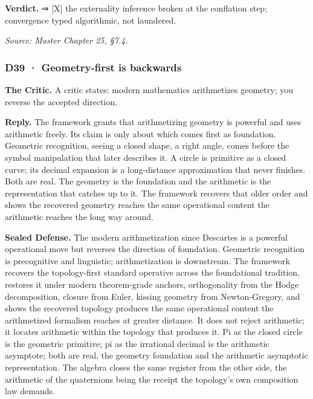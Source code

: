 \documentclass[10pt,twocolumn]{article}
\begin{document}
\textbf{Verdict.} ⇒ {[}X{]} the externality inference broken at the
conflation step; convergence typed algorithmic, not laundered.

\emph{Source: Master Chapter 25, §7.4.}

\hypertarget{d39-geometry-first-is-backwards}{%
\subsubsection{D39 · Geometry-first is
backwards}\label{d39-geometry-first-is-backwards}}

\textbf{The Critic.} A critic states: modern mathematics arithmetizes
geometry; you reverse the accepted direction.

\textbf{Reply.} The framework grants that arithmetizing geometry is
powerful and uses arithmetic freely. Its claim is only about which comes
first as foundation. Geometric recognition, seeing a closed shape, a
right angle, comes before the symbol manipulation that later describes
it. A circle is primitive as a closed curve; its decimal expansion is a
long-distance approximation that never finishes. Both are real. The
geometry is the foundation and the arithmetic is the representation that
catches up to it. The framework recovers that older order and shows the
recovered geometry reaches the same operational content the arithmetic
reaches the long way around.

\textbf{Sealed Defense.} The modern arithmetization since Descartes is a
powerful operational move but reverses the direction of foundation.
Geometric recognition is precognitive and linguistic; arithmetization is
downstream. The framework recovers the topology-first standard operative
across the foundational tradition, restores it under modern
theorem-grade anchors, orthogonality from the Hodge decomposition,
closure from Euler, kissing geometry from Newton-Gregory, and shows the
recovered topology produces the same operational content the
arithmetized formalism reaches at greater distance. It does not reject
arithmetic; it locates arithmetic within the topology that produces it.
Pi as the closed circle is the geometric primitive; pi as the irrational
decimal is the arithmetic asymptote; both are real, the geometry
foundation and the arithmetic asymptotic representation. The algebra
closes the same register from the other side, the arithmetic of the
quaternions being the receipt the topology's own composition law
demands.
\end{document}
